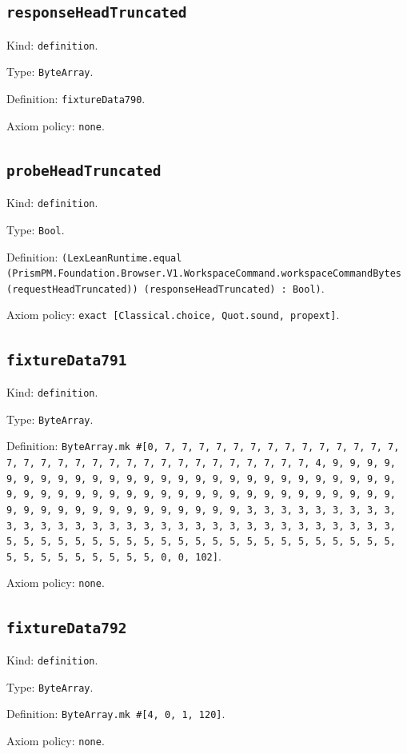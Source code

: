\documentclass[11pt]{article}
\begin{document}
\subsection*{\texttt{responseHeadTruncated}}
\noindent Kind: \texttt{definition}.\par
\noindent Type: \texttt{ByteArray}.\par
\noindent Definition: \texttt{fixtureData790}.\par
\noindent Axiom policy: \texttt{none}.\par
\subsection*{\texttt{probeHeadTruncated}}
\noindent Kind: \texttt{definition}.\par
\noindent Type: \texttt{Bool}.\par
\noindent Definition: \texttt{(LexLeanRuntime.equal (PrismPM.Foundation.Browser.V1.WorkspaceCommand.workspaceCommandBytes (requestHeadTruncated)) (responseHeadTruncated) : Bool)}.\par
\noindent Axiom policy: \texttt{exact [Classical.choice, Quot.sound, propext]}.\par
\subsection*{\texttt{fixtureData791}}
\noindent Kind: \texttt{definition}.\par
\noindent Type: \texttt{ByteArray}.\par
\noindent Definition: \texttt{ByteArray.mk \#[0, 7, 7, 7, 7, 7, 7, 7, 7, 7, 7, 7, 7, 7, 7, 7, 7, 7, 7, 7, 7, 7, 7, 7, 7, 7, 7, 7, 7, 7, 7, 7, 7, 4, 9, 9, 9, 9, 9, 9, 9, 9, 9, 9, 9, 9, 9, 9, 9, 9, 9, 9, 9, 9, 9, 9, 9, 9, 9, 9, 9, 9, 9, 9, 9, 9, 9, 9, 9, 9, 9, 9, 9, 9, 9, 9, 9, 9, 9, 9, 9, 9, 9, 9, 9, 9, 9, 9, 9, 9, 9, 9, 9, 9, 9, 9, 9, 9, 3, 3, 3, 3, 3, 3, 3, 3, 3, 3, 3, 3, 3, 3, 3, 3, 3, 3, 3, 3, 3, 3, 3, 3, 3, 3, 3, 3, 3, 3, 3, 3, 5, 5, 5, 5, 5, 5, 5, 5, 5, 5, 5, 5, 5, 5, 5, 5, 5, 5, 5, 5, 5, 5, 5, 5, 5, 5, 5, 5, 5, 5, 5, 5, 0, 0, 102]}.\par
\noindent Axiom policy: \texttt{none}.\par
\subsection*{\texttt{fixtureData792}}
\noindent Kind: \texttt{definition}.\par
\noindent Type: \texttt{ByteArray}.\par
\noindent Definition: \texttt{ByteArray.mk \#[4, 0, 1, 120]}.\par
\noindent Axiom policy: \texttt{none}.\par
\end{document}
